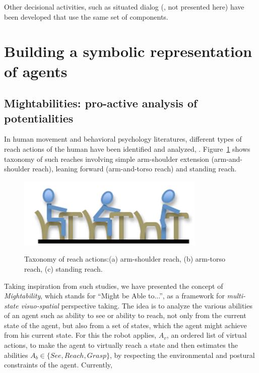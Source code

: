 \documentclass{svmult}
\begin{document}
Other decisional activities, such as situated dialog (\cite{Ros2010b,
  Lemaignan2011}, not presented here) have been developed that use the
same set of components.





\section{Building a symbolic representation of agents}
\label{grounding_agents}


\subsection{Mightabilities: pro-active analysis of potentialities}


In human movement and behavioral psychology literatures, different types of
reach actions of the human have been identified and analyzed,
\cite{Gardner2001, Choi2004}.  Figure~\ref{fig|reaches_taxonomy} shows taxonomy
of such reaches involving simple arm-shoulder extension (arm-and-shoulder
reach), leaning forward (arm-and-torso reach) and standing reach.

\begin{figure}
  \centering
  \includegraphics[width=0.8\textwidth]{./figs/mightabilities/1.png} \\
  \caption {Taxonomy of reach actions:(a) arm-shoulder reach, (b) arm-torso 
  reach, (c) standing reach.}
  \label{fig|reaches_taxonomy}
\end{figure}

Taking inspiration from such studies, we have presented the concept of
\emph{Mightability}, which stands for ``Might be Able to...'', as a framework for
\emph{multi-state visuo-spatial} perspective taking. The idea is to analyze the
various abilities of an agent such as ability to see or ability to reach, not
only from the current state of the agent, but also from a set of states, which
the agent might achieve from his current state. For this the robot applies, $A_v$,
an ordered list of virtual actions, to make the agent to virtually reach a state
and then estimates the abilities $A_b \in \{See, Reach, Grasp\}$, by respecting the
environmental and postural constraints of the agent. Currently,
\end{document}
